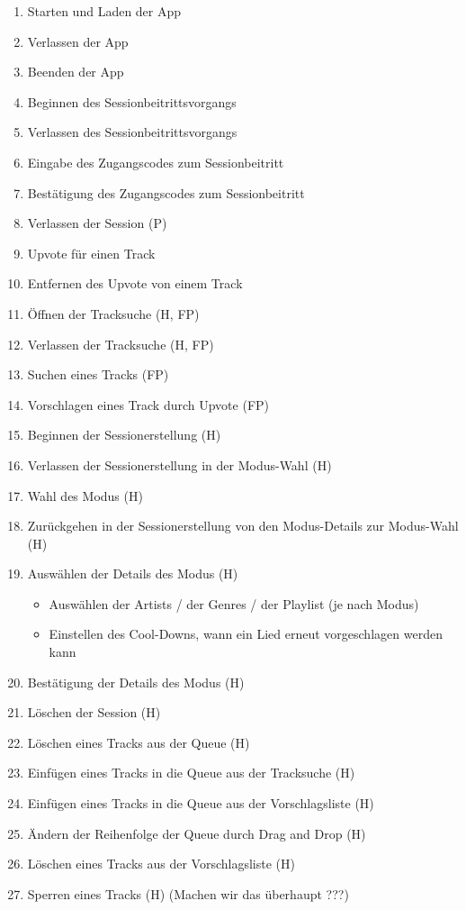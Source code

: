 \documentclass[oneside, ngerman]{sdqtechreport}
\begin{document}
\begin{enumerate}
    \item Starten und Laden der App
    \item Verlassen der App
    \item Beenden der App
    \item Beginnen des Sessionbeitrittsvorgangs
    \item Verlassen des Sessionbeitrittsvorgangs
    \item Eingabe des Zugangscodes zum Sessionbeitritt
    \item Bestätigung des Zugangscodes zum Sessionbeitritt
    \item Verlassen der Session (P)
    \item Upvote für einen Track
    \item Entfernen des Upvote von einem Track
    \item Öffnen der Tracksuche (H, FP)
    \item Verlassen der Tracksuche (H, FP)
    \item Suchen eines Tracks (FP)
    \item Vorschlagen eines Track durch Upvote (FP)
    \item Beginnen der Sessionerstellung (H)
    \item Verlassen der Sessionerstellung in der Modus-Wahl (H)
    \item Wahl des Modus (H)
    \item Zurückgehen in der Sessionerstellung von den Modus-Details zur Modus-Wahl (H)
    \item Auswählen der Details des Modus (H)
    \begin{itemize}
        \item Auswählen der Artists / der Genres / der Playlist (je nach Modus)
        \item Einstellen des Cool-Downs, wann ein Lied erneut vorgeschlagen werden kann
    \end{itemize}
    \item Bestätigung der Details des Modus (H)
    \item Löschen der Session (H)
    \item Löschen eines Tracks aus der Queue (H)
    \item Einfügen eines Tracks in die Queue aus der Tracksuche (H)
    \item Einfügen eines Tracks in die Queue aus der Vorschlagsliste (H)
    \item Ändern der Reihenfolge der Queue durch Drag and Drop (H)
    \item Löschen eines Tracks aus der Vorschlagsliste (H)
    \item Sperren eines Tracks (H) (Machen wir das überhaupt ???)
\end{enumerate}
\end{document}
